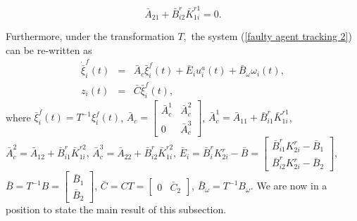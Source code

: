 \documentclass[12pt,draftcls,onecolumn]{IEEEtran}
\begin{document}
\begin{equation*}
\bar A_{21}+\bar B_{i2}^r \bar K_{1i}^{r1}=0. \label{eq 3.2}
\end{equation*}\par
Furthermore, under the transformation $T,$ the system (\ref{faulty agent tracking 2}) can be re-written as
\begin{eqnarray}
\dot{\bar \xi}_i^f(t)&=&\bar A_c\bar\xi_i^f(t)+\bar E_iu_i^a(t)+\bar B_{\omega}\omega_i(t),\label{eq. 2.6}\\
 z_i(t)&=&\bar C\bar \xi_i^f(t),\nonumber
\end{eqnarray}
where $\bar\xi_i^f(t)=T^{-1}\xi_i^f(t)$, $\bar A_c=\begin{bmatrix}\bar A_{c}^1&\bar A_{c}^2\\ 0&\bar A_{c}^3\end{bmatrix}$, $\bar A_{c}^1=\bar A_{11}+\bar B_{i1}^r\bar K_{1i}^{r1}$, $\bar A_{c}^2=\bar A_{12}+\bar B_{i1}^r\bar K_{1i}^{r2}$, $\bar A_{c}^3=\bar A_{22}+\bar B_{i2}^r\bar K_{1i}^{r2}$, $\bar E_i=\bar B_i^r K_{2i}^{r}-\bar B=\begin{bmatrix}\bar B_{i1}^r K_{2i}^{r}-\bar B_1\\ \bar B_{i2}^r K_{2i}^{r}-\bar B_2 \end{bmatrix}$, $\bar B=T^{-1}B=\begin{bmatrix}\bar B_{1}\\ \bar B_{2}\end{bmatrix}$, $\bar C=CT=\begin{bmatrix}0& \bar C_2\end{bmatrix}$, $\bar B_{\omega}=T^{-1}B_{\omega}$. We are now in a position to state the main result of this subsection.  
\end{document}
